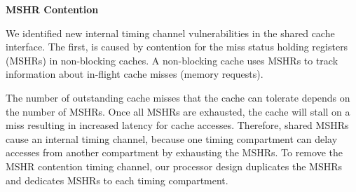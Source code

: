 
\textbf{MSHR Contention}

We identified new internal timing channel vulnerabilities in the shared cache 
interface. The first, is caused by contention for the miss status holding 
registers (MSHRs) in non-blocking caches.
A non-blocking cache uses MSHRs to track information about in-flight cache misses 
(memory requests).

The number of outstanding cache misses that the cache can tolerate depends on 
the number of MSHRs. Once all MSHRs are exhausted, the cache will stall on
a miss resulting in increased latency for cache accesses.
Therefore, shared MSHRs cause an internal timing channel, because one timing
compartment can delay accesses from another compartment by exhausting the MSHRs.
To remove the MSHR contention timing channel, our processor design duplicates
the MSHRs and dedicates MSHRs to each timing compartment.

